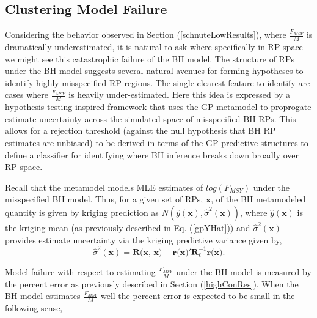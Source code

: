 
%
\subsection{Clustering Model Failure}

%
Considering the behavior observed in Section (\ref{schnuteLowResults}), where
$\frac{F_{MSY}}{M}$ is dramatically underestimated, it is natural to ask
where specifically in RP space we might see this catastrophic failure of the
BH model.
%
The structure of RPs under the BH model suggests several natural avenues for
forming hypotheses to identify highly misspecified RP regions. The single
clearest feature to identify are cases where $\frac{F_{MSY}}{M}$ is
heavily under-estimated. Here this idea is expressed by a hypothesis testing
inspired framework that uses the GP metamodel to proprogate estimate
uncertainty across the simulated space of misspecified BH RPs.
This allows for a rejection threshold (against the null hypothesis that BH RP
estimates are unbiased) to be derived in terms of the GP predictive structures
to define a classifier for identifying where BH inference breaks down
broadly over RP space.


%
Recall that the metamodel models MLE estimates of $log(F_{MSY})$ under the misspecified BH model.
Thus, for a given set of RPs, $\textbf{x}$, of the BH metamodeled
quantity is given by kriging prediction as $N(\hat y(\textbf{x}), \hat \sigma^2(\textbf{x}))$,
where $\hat y(\textbf{x})$ is the kriging mean (as previously described in
Eq. (\ref{gpYHat})) and $\hat \sigma^2(\textbf{x})$ provides estimate
uncertainty via the kriging predictive variance given by,
\begin{equation} %
       \hat \sigma^2(\textbf{x}) = \textbf{R(x, x)} - \textbf{r(x)}'\bm{R}^{-1}_{\bm{\ell}}\textbf{r(x)}.
\end{equation}

%
Model failure with respect to estimating $\frac{F_{MSY}}{M}$ under the BH
model is measured by the percent error as previously described in Section (\ref{highConRes}).
When the BH model estimates $\frac{F_{MSY}}{M}$ well the percent error is
expected to be small in the following sense,


